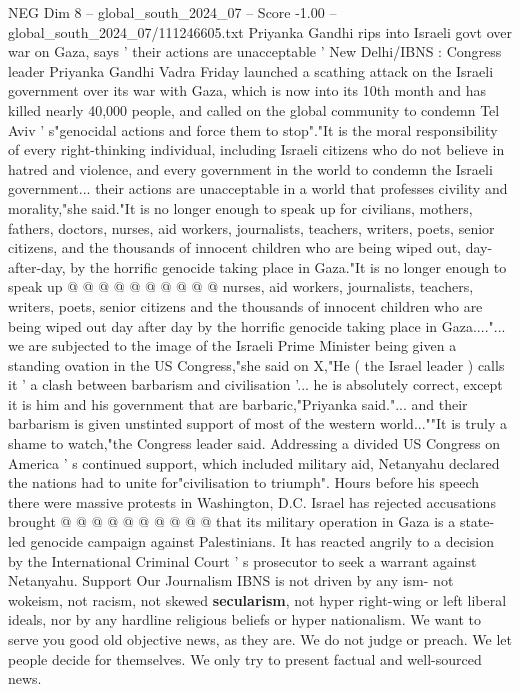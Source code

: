 \begin{textsample}{NEG Dim 8 – global\_south\_2024\_07 – Score -1.00 – global\_south\_2024\_07/111246605.txt}  \label{ex:f8_neg_353}
Priyanka Gandhi rips into Israeli govt over war on Gaza, says ' their actions are unacceptable ' New Delhi/IBNS : Congress leader Priyanka Gandhi Vadra Friday launched a scathing attack on the Israeli government over its war with Gaza, which is now into its 10th month and has killed nearly 40,000 people, and called on the global community to condemn Tel Aviv ' s"genocidal actions and force them to stop"."It is the moral responsibility of every right-thinking individual, including Israeli citizens who do not believe in hatred and violence, and every government in the world to condemn the Israeli government... their actions are unacceptable in a world that professes civility and morality,"she said."It is no longer enough to speak up for civilians, mothers, fathers, doctors, nurses, aid workers, journalists, teachers, writers, poets, senior citizens, and the thousands of innocent children who are being wiped out, day-after-day, by the horrific genocide taking place in Gaza."It is no longer enough to speak up @ @ @ @ @ @ @ @ @ @ nurses, aid workers, journalists, teachers, writers, poets, senior citizens and the thousands of innocent children who are being wiped out day after day by the horrific genocide taking place in Gaza...."... we are subjected to the image of the Israeli Prime Minister being given a standing ovation in the US Congress,"she said on X,"He ( the Israel leader ) calls it ' a clash between barbarism and civilisation '... he is absolutely correct, except it is him and his government that are barbaric,"Priyanka said."... and their barbarism is given unstinted support of most of the western world...""It is truly a shame to watch,"the Congress leader said.
Addressing a divided US Congress on America ' s continued support, which included military aid, Netanyahu declared the nations had to unite for"civilisation to triumph".
Hours before his speech there were massive protests in Washington, D.C.
Israel has rejected accusations brought @ @ @ @ @ @ @ @ @ @ that its military operation in Gaza is a state-led genocide campaign against Palestinians.
It has reacted angrily to a decision by the International Criminal Court ' s prosecutor to seek a warrant against Netanyahu.
Support Our Journalism IBNS is not driven by any ism- not wokeism, not racism, not skewed \textbf{secularism}, not hyper right-wing or left liberal ideals, nor by any hardline religious beliefs or hyper nationalism.
We want to serve you good old objective news, as they are.
We do not judge or preach.
We let people decide for themselves.
We only try to present factual and well-sourced news.

\end{textsample}
